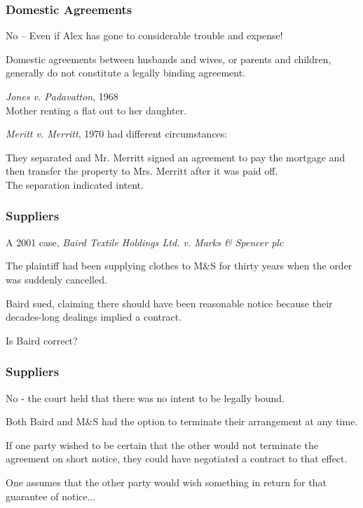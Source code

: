 \begin{frame}
\frametitle{Domestic Agreements}

No -- Even if Alex has gone to considerable trouble and expense!

Domestic agreements between husbands and wives, or parents and children, generally do not constitute a legally binding agreement.

\textit{Jones v. Padavatton}, 1968\\
\quad Mother renting a flat out to her daughter.

\textit{Meritt v. Merritt}, 1970 had different circumstances:

They separated and Mr. Merritt signed an agreement to pay the mortgage and then transfer the property to Mrs. Merritt after it was paid off.\\
\quad The separation indicated intent.


\end{frame}



\begin{frame}
\frametitle{Suppliers}

A 2001 case, \textit{Baird Textile Holdings Ltd. v. Marks \& Spencer plc}

The plaintiff had been supplying clothes to M\&S for thirty years when the order was suddenly cancelled.

Baird sued, claiming there should have been reasonable notice because their decades-long dealings implied a contract.

Is Baird correct?

\end{frame}



\begin{frame}
\frametitle{Suppliers}

No - the court held that there was no intent to be legally bound.

Both Baird and M\&S had the option to terminate their arrangement at any time.

If one party wished to be certain that the other would not terminate the agreement on short notice, they could have negotiated a contract to that effect.

One assumes that the other party would wish something in return for that guarantee of notice...

\end{frame}



